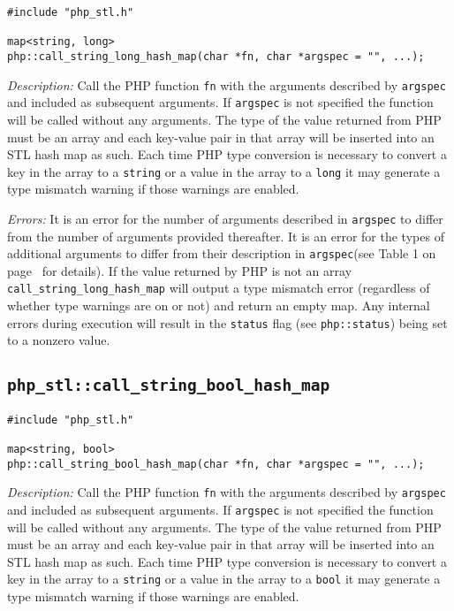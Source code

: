 \documentclass[11pt,titlepage]{article}
\begin{document}
\begin{verbatim}
#include "php_stl.h"

map<string, long> 
php::call_string_long_hash_map(char *fn, char *argspec = "", ...);
\end{verbatim}

\emph{Description:} Call the PHP function \verb|fn| with the arguments described by \verb|argspec| and included as subsequent arguments. If \verb|argspec| is not specified the function will be called without any arguments. The type of the value returned from PHP must be an array and each key-value pair in that array will be inserted into an STL hash map as such. Each time PHP type conversion is necessary to convert a key in the array to a \verb|string| or a value in the array to a \verb|long| it may generate a type mismatch warning if those warnings are enabled.

\emph{Errors:} It is an error for the number of arguments described in \verb|argspec| to differ from the number of arguments provided thereafter. It is an error for the types of additional arguments to differ from their description in \verb|argspec|(see Table 1 on page~\pageref{Table1} for details). If the value returned by PHP is not an array \verb|call_string_long_hash_map| will output a type mismatch error (regardless of whether type warnings are on or not) and return an empty map. Any internal errors during execution will result in the \verb|status| flag (see \verb|php::status|) being set to a nonzero value.


\subsection{\texttt{php\_stl::call\_string\_bool\_hash\_map}}

\begin{verbatim}
#include "php_stl.h"

map<string, bool> 
php::call_string_bool_hash_map(char *fn, char *argspec = "", ...);
\end{verbatim}

\emph{Description:} Call the PHP function \verb|fn| with the arguments described by \verb|argspec| and included as subsequent arguments. If \verb|argspec| is not specified the function will be called without any arguments. The type of the value returned from PHP must be an array and each key-value pair in that array will be inserted into an STL hash map as such. Each time PHP type conversion is necessary to convert a key in the array to a \verb|string| or a value in the array to a \verb|bool| it may generate a type mismatch warning if those warnings are enabled.
\end{document}

